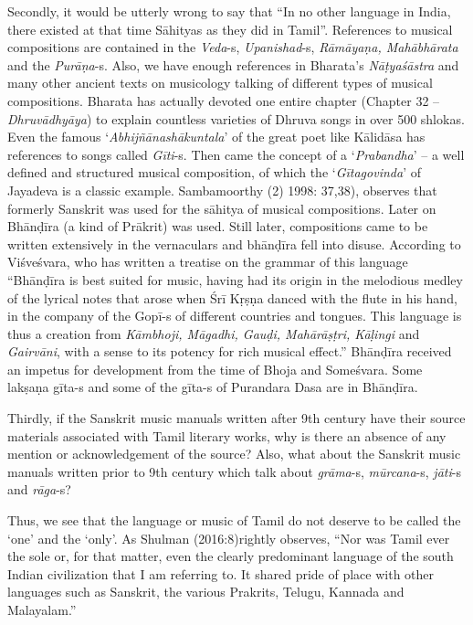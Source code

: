 Secondly, it would be utterly wrong to say that “In no other language in India, there existed at that time Sāhityas as they did in Tamil”. References to musical compositions are contained in the \textit{Veda}-s, \textit{Upanishad}-s, \textit{Rāmāyaṇa, Mahābhārata} and the \textit{Purāṇa}-s. Also, we have enough references in Bharata’s \textit{Nāṭyaśāstra} and many other ancient texts on musicology talking of different types of musical compositions. Bharata has actually devoted one entire chapter (Chapter 32 – \textit{Dhruvādhyāya}) to explain countless varieties of Dhruva songs in over 500 shlokas. Even the famous ‘\textit{Abhijñānashākuntala}’ of the great poet like Kālidāsa has references to songs called \textit{Gīti}-s. Then came the concept of a ‘\textit{Prabandha}’ – a well defined and structured musical composition, of which the ‘\textit{Gītagovinda}’ of Jayadeva is a classic example. Sambamoorthy (2) 1998: 37,38), observes that formerly Sanskrit was used for the sāhitya of musical compositions. Later on Bhānḍīra (a kind of Prākrit) was used. Still later, compositions came to be written extensively in the vernaculars and bhānḍīra fell into disuse. According to Viśveśvara, who has written a treatise on the grammar of this language “Bhānḍīra is best suited for music, having had its origin in the melodious medley of the lyrical notes that arose when Śrī Kṛṣṇa danced with the flute in his hand, in the company of the Gopī-s of different countries and tongues. This language is thus a creation from \textit{Kāmbhoji, Māgadhi, Gauḍi, Mahārāṣṭri, Kāḷingi} and \textit{Gairvāni}, with a sense to its potency for rich musical effect.” Bhānḍīra received an impetus for development from the time of Bhoja and Someśvara. Some lakṣaṇa gīta-s and some of the gīta-s of Purandara Dasa are in Bhānḍīra.

Thirdly, if the Sanskrit music manuals written after 9th century have their source materials associated with Tamil literary works, why is there an absence of any mention or acknowledgement of the source? Also, what about the Sanskrit music manuals written prior to 9th century which talk about \textit{grāma}-s, \textit{mūrcana}-s, \textit{jāti}-s and \textit{rāga}-s?

Thus, we see that the language or music of Tamil do not deserve to be called the ‘one’ and the ‘only’. As Shulman (2016:8)rightly observes, “Nor was Tamil ever the sole or, for that matter, even the clearly predominant language of the south Indian civilization that I am referring to. It shared pride of place with other languages such as Sanskrit, the various Prakrits, Telugu, Kannada and Malayalam.”

